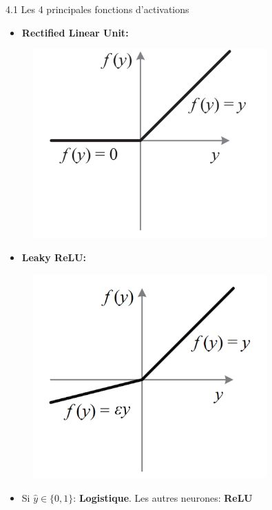 \begin{frame}{4.1 Les 4 principales fonctions d'activations}
\begin{minipage}{0.48\textwidth}
    \begin{itemize}
    \item \textbf{Rectified Linear Unit:}
    \end{itemize}
    \vspace{-0.2cm}
    \begin{figure}
      \includegraphics[width=0.8\textwidth,height=0.3\textheight]{fig/reluFct.jpeg}
    \end{figure}
  \end{minipage}
  \begin{minipage}{0.48\textwidth}
    \begin{itemize}
    \item \textbf{Leaky ReLU:}
    \end{itemize}
    \vspace{-0.5cm}
    \begin{figure}
      \includegraphics[width=0.8\textwidth,height=0.3\textheight]{fig/leakyReluFct.png}
    \end{figure}
  \end{minipage}
  \begin{itemize}
  \item Si $\hat{y} \in \{0,1\}$: \textbf{Logistique}. Les autres neurones: \textbf{ReLU}
  \end{itemize}
\end{frame}

